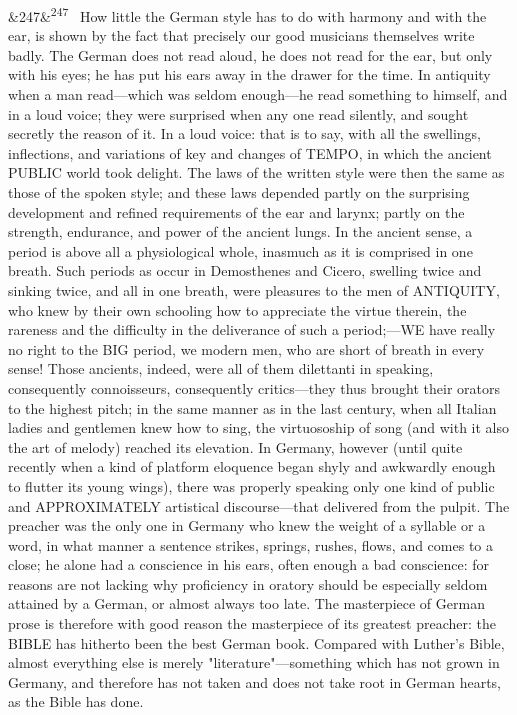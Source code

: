\documentclass[12pt]{article}
\newcommand{\para}[1][]{\par\noindent\ifx&#1&\else\textsuperscript{\footnotesize #1}~\fi}
\begin{document}
\para[247] How little the German style has to do with harmony and with the ear, is shown by the fact that precisely our good musicians themselves write badly. The German does not read aloud, he does not read for the ear, but only with his eyes; he has put his ears away in the drawer for the time. In antiquity when a man read---which was seldom enough---he read something to himself, and in a loud voice; they were surprised when any one read silently, and sought secretly the reason of it. In a loud voice: that is to say, with all the swellings, inflections, and variations of key and changes of TEMPO, in which the ancient PUBLIC world took delight. The laws of the written style were then the same as those of the spoken style; and these laws depended partly on the surprising development and refined requirements of the ear and larynx; partly on the strength, endurance, and power of the ancient lungs. In the ancient sense, a period is above all a physiological whole, inasmuch as it is comprised in one breath. Such periods as occur in Demosthenes and Cicero, swelling twice and sinking twice, and all in one breath, were pleasures to the men of ANTIQUITY, who knew by their own schooling how to appreciate the virtue therein, the rareness and the difficulty in the deliverance of such a period;---WE have really no right to the BIG period, we modern men, who are short of breath in every sense! Those ancients, indeed, were all of them dilettanti in speaking, consequently connoisseurs, consequently critics---they thus brought their orators to the highest pitch; in the same manner as in the last century, when all Italian ladies and gentlemen knew how to sing, the virtuosoship of song (and with it also the art of melody) reached its elevation. In Germany, however (until quite recently when a kind of platform eloquence began shyly and awkwardly enough to flutter its young wings), there was properly speaking only one kind of public and APPROXIMATELY artistical discourse---that delivered from the pulpit. The preacher was the only one in Germany who knew the weight of a syllable or a word, in what manner a sentence strikes, springs, rushes, flows, and comes to a close; he alone had a conscience in his ears, often enough a bad conscience: for reasons are not lacking why proficiency in oratory should be especially seldom attained by a German, or almost always too late. The masterpiece of German prose is therefore with good reason the masterpiece of its greatest preacher: the BIBLE has hitherto been the best German book. Compared with Luther's Bible, almost everything else is merely "literature"---something which has not grown in Germany, and therefore has not taken and does not take root in German hearts, as the Bible has done.
\end{document}
